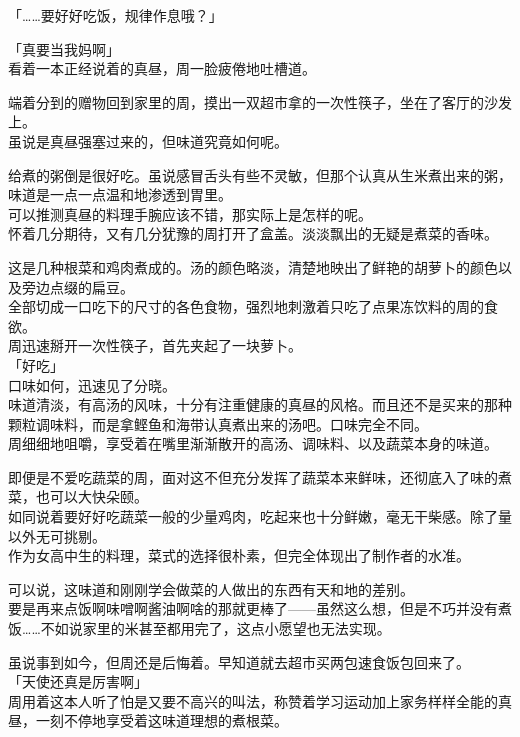「……要好好吃饭，规律作息哦？」

「真要当我妈啊」\\

看着一本正经说着的真昼，周一脸疲倦地吐槽道。\\

\vspace{2\baselineskip}

端着分到的赠物回到家里的周，摸出一双超市拿的一次性筷子，坐在了客厅的沙发上。\\

虽说是真昼强塞过来的，但味道究竟如何呢。

给煮的粥倒是很好吃。虽说感冒舌头有些不灵敏，但那个认真从生米煮出来的粥，味道是一点一点温和地渗透到胃里。\\

可以推测真昼的料理手腕应该不错，那实际上是怎样的呢。\\

怀着几分期待，又有几分犹豫的周打开了盒盖。淡淡飘出的无疑是煮菜的香味。

这是几种根菜和鸡肉煮成的。汤的颜色略淡，清楚地映出了鲜艳的胡萝卜的颜色以及旁边点缀的扁豆。\\

全部切成一口吃下的尺寸的各色食物，强烈地刺激着只吃了点果冻饮料的周的食欲。\\

周迅速掰开一次性筷子，首先夹起了一块萝卜。\\

「好吃」\\

口味如何，迅速见了分晓。\\

味道清淡，有高汤的风味，十分有注重健康的真昼的风格。而且还不是买来的那种颗粒调味料，而是拿鲣鱼和海带认真煮出来的汤吧。口味完全不同。\\

周细细地咀嚼，享受着在嘴里渐渐散开的高汤、调味料、以及蔬菜本身的味道。

即便是不爱吃蔬菜的周，面对这不但充分发挥了蔬菜本来鲜味，还彻底入了味的煮菜，也可以大快朵颐。\\

如同说着要好好吃蔬菜一般的少量鸡肉，吃起来也十分鲜嫩，毫无干柴感。除了量以外无可挑剔。\\

作为女高中生的料理，菜式的选择很朴素，但完全体现出了制作者的水准。

可以说，这味道和刚刚学会做菜的人做出的东西有天和地的差别。\\

要是再来点饭啊味噌啊酱油啊啥的那就更棒了——虽然这么想，但是不巧并没有煮饭……不如说家里的米甚至都用完了，这点小愿望也无法实现。

虽说事到如今，但周还是后悔着。早知道就去超市买两包速食饭包回来了。\\

「天使还真是厉害啊」\\

周用着这本人听了怕是又要不高兴的叫法，称赞着学习运动加上家务样样全能的真昼，一刻不停地享受着这味道理想的煮根菜。
